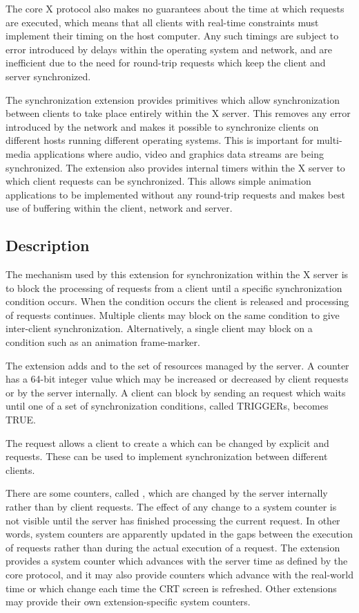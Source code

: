 The core X protocol also makes no guarantees about the time at which requests
are executed, which means that all clients with real-time constraints must
implement their timing on the host computer. Any such timings are subject to
error introduced by delays within the operating system and network, and are
inefficient due to the need for round-trip requests which keep the client and
server synchronized.

The synchronization extension provides primitives which allow synchronization
between clients to take place entirely within the X server. This removes any
error introduced by the network and makes it possible to synchronize clients
on different hosts running different operating systems. This is important for
multi-media applications where audio, video and graphics data streams are
being synchronized. The extension also provides internal timers within the X
server to which client requests can be synchronized. This allows simple
animation applications to be implemented without any round-trip requests and
makes best use of buffering within the client, network and server.

\subsection*{Description}

The mechanism used by this extension for synchronization within the X server
is to block the processing of requests from a client until a specific
synchronization condition occurs. When the condition occurs the client is
released and processing of requests continues. Multiple clients may block on
the same condition to give inter-client synchronization.  Alternatively, a
single client may block on a condition such as an animation frame-marker.

The extension adds  and  to the set of resources
managed by the server. A counter has a 64-bit integer value which may be
increased or decreased by client requests or by the server internally. A
client can block by sending an  request which waits until
one of a set of synchronization conditions, called TRIGGERs, becomes TRUE.

The  request allows a client to create a
 which can be changed by explicit  and
 requests. These can be used to implement
synchronization between different clients.

There are some counters, called , which are changed by
the server internally rather than by client requests. The effect of any change
to a system counter is not visible until the server has finished processing the
current request. In other words, system counters are apparently updated in the
gaps between the execution of requests rather than during the actual execution
of a request. The extension provides a system counter which advances with the
server time as defined by the core protocol, and it may also provide counters
which advance with the real-world time or which change each time the CRT
screen is refreshed.  Other extensions may provide their own
extension-specific system counters.

